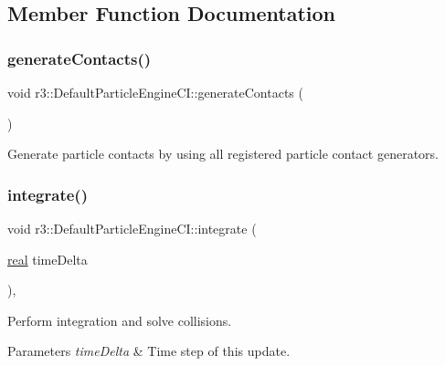 \subsection{Member Function Documentation}
\mbox{\label{classr3_1_1_default_particle_engine_c_i_a61aea4f32cc73960915d3c68396bd47e}} 
\subsubsection{\texorpdfstring{generate\+Contacts()}{generateContacts()}}
{\footnotesize\ttfamily void r3\+::\+Default\+Particle\+Engine\+C\+I\+::generate\+Contacts (\begin{DoxyParamCaption}{ }\end{DoxyParamCaption})\hspace{0.3cm}{\ttfamily [protected]}}



Generate particle contacts by using all registered particle contact generators. 

\mbox{\label{classr3_1_1_default_particle_engine_c_i_a4603707afe6c841a83294a46ea4a1c62}} 
\subsubsection{\texorpdfstring{integrate()}{integrate()}}
{\footnotesize\ttfamily void r3\+::\+Default\+Particle\+Engine\+C\+I\+::integrate (\begin{DoxyParamCaption}\item[{\mbox{\hyperlink{namespacer3_ab2016b3e3f743fb735afce242f0dc1eb}{real}}}]{time\+Delta }\end{DoxyParamCaption})\hspace{0.3cm}{\ttfamily [override]}, {\ttfamily [virtual]}}



Perform integration and solve collisions. 


\begin{DoxyParams}{Parameters}
{\em time\+Delta} & Time step of this update. \\
\hline
\end{DoxyParams}



